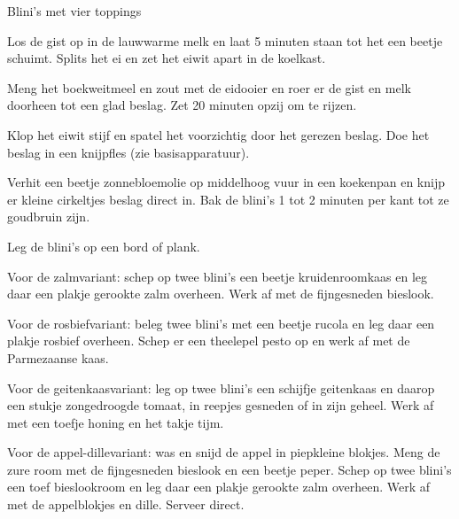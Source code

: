 \begin{recipe}{Blini's met vier toppings}
\begin{steps}
  \item Los de gist op in de lauwwarme melk en laat 5 minuten staan tot het
        een beetje schuimt. Splits het ei en zet het eiwit apart in de
        koelkast.
  \item Meng het boekweitmeel en zout met de eidooier en roer er de gist en
        melk doorheen tot een glad beslag. Zet 20 minuten opzij om te rijzen.
  \item Klop het eiwit stijf en spatel het voorzichtig door het gerezen
        beslag. Doe het beslag in een knijpfles (zie basisapparatuur).
  \item Verhit een beetje zonnebloemolie op middelhoog vuur in een koekenpan
        en knijp er kleine cirkeltjes beslag direct in. Bak de blini's 1 tot
        2 minuten per kant tot ze goudbruin zijn.
  \item Leg de blini's op een bord of plank.
  \item Voor de zalmvariant: schep op twee blini's een beetje kruidenroomkaas
        en leg daar een plakje gerookte zalm overheen. Werk af met de
        fijngesneden bieslook.
  \item Voor de rosbiefvariant: beleg twee blini's met een beetje rucola en
        leg daar een plakje rosbief overheen. Schep er een theelepel pesto
        op en werk af met de Parmezaanse kaas.
  \item Voor de geitenkaasvariant: leg op twee blini's een schijfje geitenkaas
        en daarop een stukje zongedroogde tomaat, in reepjes gesneden of
        in zijn geheel. Werk af met een toefje honing en het takje tijm.
  \item Voor de appel-dillevariant: was en snijd de appel in piepkleine
        blokjes. Meng de zure room met de fijngesneden bieslook en een
        beetje peper. Schep op twee blini's een toef bieslookroom en leg
        daar een plakje gerookte zalm overheen. Werk af met de appelblokjes
        en dille. Serveer direct.
\end{steps}

\end{recipe}
